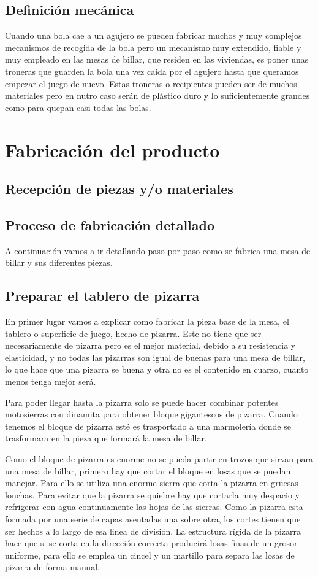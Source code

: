 		    

	\subsection {Definición mecánica}
		    Cuando una bola cae a un agujero se pueden fabricar muchos y muy complejos mecanismos de recogida de la bola pero un mecanismo muy extendido,
		    fiable y muy empleado en las mesas de billar, que residen en las viviendas, es poner unas troneras que guarden la bola una vez caida por el agujero hasta que queramos empezar
		    el juego de nuevo. Estas troneras o recipientes pueden ser de muchos materiales pero en nutro caso serán de plástico duro y lo suficientemente grandes como para quepan casi todas las bolas. 
\section {Fabricación del producto}

	\subsection {Recepción de piezas y/o materiales}

	\subsection {Proceso de fabricación detallado}
		A  continuación vamos a  ir detallando paso por paso como se fabrica una mesa de billar y sus diferentes piezas.
		
		\subsection {Preparar el tablero de pizarra}
			En primer lugar vamos a explicar como fabricar la pieza base de la mesa, el tablero o superficie de juego, hecho de pizarra. Este no tiene que ser necesariamente de pizarra pero es el mejor material, debido a  su resistencia y elasticidad, y no todas las pizarras son igual de buenas para una mesa de billar, lo que hace que una pizarra se buena y otra no es el contenido en cuarzo, cuanto menos tenga mejor será.

Para poder llegar hasta la pizarra solo se puede hacer combinar potentes motosierras con dinamita para obtener bloque gigantescos de pizarra. Cuando tenemos el bloque de pizarra esté es trasportado a una marmolería donde se trasformara en la pieza que formará la mesa de billar.

Como el bloque de pizarra es enorme  no se pueda partir  en trozos que sirvan para una mesa de billar, primero hay que cortar el bloque en losas que se puedan manejar. Para ello se utiliza una enorme sierra que corta la pizarra en gruesas lonchas. Para evitar que la pizarra se quiebre hay que cortarla muy despacio y refrigerar con agua continuamente las hojas de las sierras. Como la pizarra esta formada por una serie de capas asentadas una sobre otra, los cortes tienen que ser hechos  a lo largo de esa linea de división.  La estructura rígida    
de la pizarra hace que si se corta en la dirección correcta producirá losas finas de un grosor uniforme, para ello se emplea un cincel y un martillo para separa las losas de pizarra de forma manual.

